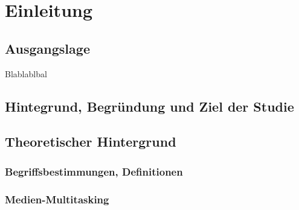 %
%
\glsresetall
\let\raggedsection\centering 
\chapter{Einleitung}\label{chap.einleitung}
\let\raggedsection\raggedright 

\section{Ausgangslage}\label{section.ausgangslage}
Blablablbal

\section{Hintegrund, Begründung und Ziel der Studie}\label{section.hintergrund}

\section{Theoretischer Hintergrund}\label{section.theoHintegrund}
\subsection{Begriffsbestimmungen, Definitionen}\label{subsection.begriffsbestimmung}
\subsection{Medien-Multitasking}\label{subsection.medienMultitasking}
